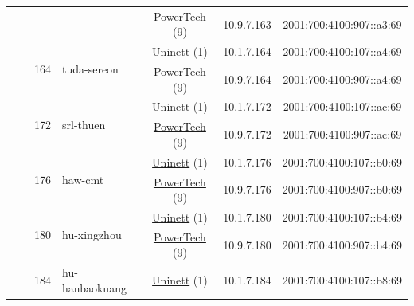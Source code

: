 \begin{small}
\begin{center}
\begin{longtable}{|c|c|c|c|c|c|c|c|}
  &  &  &  & \multicolumn{2}{|c|}{\tiny{\href{http://www.powertech.no}{PowerTech} (9)}} & \tiny{10.9.7.163} & \tiny{2001:700:4100:907::a3:69} \\* \cline{3-3}\cline{4-4}\cline{5-5}\cline{6-6}\cline{7-7}\cline{8-8}
  &  & \multirow{2}{*}{\tiny{164}} & \multicolumn{1}{|l|}{\multirow{2}{*}{\tiny{tuda-sereon}}} & \multicolumn{2}{|c|}{\tiny{\href{https://www.uninett.no}{Uninett} (1)}} & \tiny{10.1.7.164} & \tiny{2001:700:4100:107::a4:69} \\* \cline{5-5}\cline{6-6}\cline{7-7}\cline{8-8}
  &  &  &  & \multicolumn{2}{|c|}{\tiny{\href{http://www.powertech.no}{PowerTech} (9)}} & \tiny{10.9.7.164} & \tiny{2001:700:4100:907::a4:69} \\* \cline{3-3}\cline{4-4}\cline{5-5}\cline{6-6}\cline{7-7}\cline{8-8}
  &  & \multirow{2}{*}{\tiny{172}} & \multicolumn{1}{|l|}{\multirow{2}{*}{\tiny{srl-thuen}}} & \multicolumn{2}{|c|}{\tiny{\href{https://www.uninett.no}{Uninett} (1)}} & \tiny{10.1.7.172} & \tiny{2001:700:4100:107::ac:69} \\* \cline{5-5}\cline{6-6}\cline{7-7}\cline{8-8}
  &  &  &  & \multicolumn{2}{|c|}{\tiny{\href{http://www.powertech.no}{PowerTech} (9)}} & \tiny{10.9.7.172} & \tiny{2001:700:4100:907::ac:69} \\* \cline{3-3}\cline{4-4}\cline{5-5}\cline{6-6}\cline{7-7}\cline{8-8}
  &  & \multirow{2}{*}{\tiny{176}} & \multicolumn{1}{|l|}{\multirow{2}{*}{\tiny{haw-cmt}}} & \multicolumn{2}{|c|}{\tiny{\href{https://www.uninett.no}{Uninett} (1)}} & \tiny{10.1.7.176} & \tiny{2001:700:4100:107::b0:69} \\* \cline{5-5}\cline{6-6}\cline{7-7}\cline{8-8}
  &  &  &  & \multicolumn{2}{|c|}{\tiny{\href{http://www.powertech.no}{PowerTech} (9)}} & \tiny{10.9.7.176} & \tiny{2001:700:4100:907::b0:69} \\* \cline{3-3}\cline{4-4}\cline{5-5}\cline{6-6}\cline{7-7}\cline{8-8}
  &  & \multirow{2}{*}{\tiny{180}} & \multicolumn{1}{|l|}{\multirow{2}{*}{\tiny{hu-xingzhou}}} & \multicolumn{2}{|c|}{\tiny{\href{https://www.uninett.no}{Uninett} (1)}} & \tiny{10.1.7.180} & \tiny{2001:700:4100:107::b4:69} \\* \cline{5-5}\cline{6-6}\cline{7-7}\cline{8-8}
  &  &  &  & \multicolumn{2}{|c|}{\tiny{\href{http://www.powertech.no}{PowerTech} (9)}} & \tiny{10.9.7.180} & \tiny{2001:700:4100:907::b4:69} \\* \cline{3-3}\cline{4-4}\cline{5-5}\cline{6-6}\cline{7-7}\cline{8-8}
  &  & \multirow{2}{*}{\tiny{184}} & \multicolumn{1}{|l|}{\multirow{2}{*}{\tiny{hu-hanbaokuang}}} & \multicolumn{2}{|c|}{\tiny{\href{https://www.uninett.no}{Uninett} (1)}} & \tiny{10.1.7.184} & \tiny{2001:700:4100:107::b8:69} \\* \cline{5-5}\cline{6-6}\cline{7-7}\cline{8-8}

\end{longtable}
\end{center}
\end{small}
